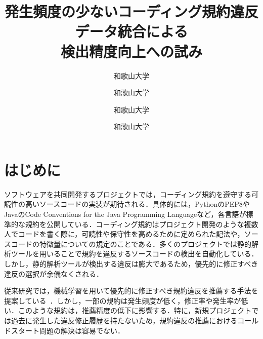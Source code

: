 \documentclass[uplatex,dvipdfmx,a4paper,twocolumn,base=11pt,jbase=11pt,ja=standard]{bxjsarticle}  %
\title{発生頻度の少ないコーディング規約違反データ統合による\\検出精度向上への試み}{Toward improving detection accuracy by integrating occasional coding convention violations datasets}
\author{和歌山大学}{亀岡　令}{Ryo Kameoka, Wakayama University}
\author{和歌山大学}{伊原　彰紀}{Akinori Ihara, Wakayama University}
\author{和歌山大学}{南　雄太}{Yuta Minami, Wakayama University}
\author{和歌山大学}{大森　楓己}{Fuki Omori, Wakayama University}
\begin{document}
\maketitle

\section{はじめに}
ソフトウェアを共同開発するプロジェクトでは，コーディング規約を遵守する可読性の高いソースコードの実装が期待される．具体的には，PythonのPEP8やJavaのCode Conventions for the Java Programming Languageなど，各言語が標準的な規約を公開している．コーディング規約はプロジェクト開発のような複数人でコードを書く際に，可読性や保守性を高めるために定められた記法や，ソースコードの特徴量についての規定のことである．多くのプロジェクトでは静的解析ツールを用いることで規約を違反するソースコードの検出を自動化している．しかし，静的解析ツールが検出する違反は膨大であるため，優先的に修正すべき違反の選択が余儀なくされる．


従来研究では，機械学習を用いて優先的に修正すべき規約違反を推薦する手法を提案している~\cite{article1}．しかし，一部の規約は発生頻度が低く，修正率や発生率が低い．このような規約は，推薦精度の低下に影響する．特に，新規プロジェクトでは過去に発生した違反修正履歴を持たないため，規約違反の推薦におけるコールドスタート問題の解決は容易でない．


\end{document}
